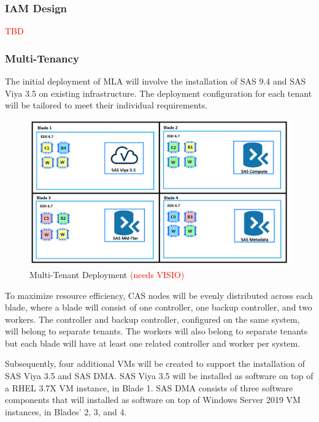 \subsubsection{IAM Design}
\textcolor{red}{TBD}

\subsubsection{Multi-Tenancy}

The initial deployment of MLA will involve the installation of SAS 9.4 and SAS Viya 3.5 on existing infrastructure. The deployment configuration for each tenant will be tailored to meet their individual requirements. 

\begin{figure}[H]
    \centering
    \includegraphics[scale = 0.52]{images/initial-deployment-diagram.png}
    \caption{Multi-Tenant Deployment \textcolor{red}{(needs VISIO)} }
    \label{Initial Multi-Tenant Deployment}
\end{figure} 

To maximize resource efficiency, CAS nodes will be evenly distributed across each blade, where a blade will consist of one controller, one backup controller, and two workers. The controller and backup controller, configured on the same system, will belong to separate tenants. The workers will also belong to separate tenants but each blade will have at least one related controller and worker per system. 

Subsequently, four additional VMs will be created to support the installation of SAS Viya 3.5 and SAS DMA. SAS Viya 3.5 will be installed as software on top of a RHEL 3.7X VM instance, in Blade 1. SAS DMA consists of three software components that will installed as software on top of Windows Server 2019 VM instances, in Blades' 2, 3, and 4. 

